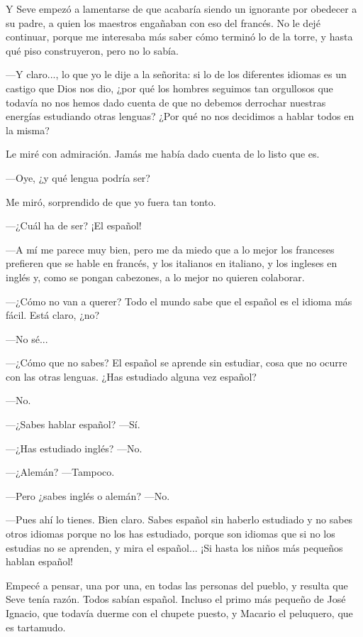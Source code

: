 \documentclass{barcodevapor3pags}
\begin{document}
Y Seve empezó a lamentarse de que acabaría siendo un ignorante por
obedecer a su padre, a quien los maestros engañaban con eso del francés.
No le dejé continuar, porque me interesaba más saber cómo terminó lo de
la torre, y hasta qué piso construyeron, pero no lo sabía.~

---Y claro..., lo que yo le dije a la señorita: si lo de los diferentes
idiomas es un castigo que Dios nos dio, ¿por qué los hombres seguimos
tan orgullosos que todavía no nos hemos dado cuenta de que no debemos
derrochar nuestras energías estudiando otras lenguas? ¿Por qué no nos
decidimos a hablar todos en la misma?~

Le miré con admiración. Jamás me había dado cuenta de lo listo que es.~

---Oye, ¿y qué lengua podría ser?~

Me miró, sorprendido de que yo fuera tan tonto.~

---¿Cuál ha de ser? ¡El español!~

---A mí me parece muy bien, pero me da miedo que a lo mejor los
franceses prefieren que se hable en francés, y los italianos en
italiano, y los ingleses en inglés y, como se pongan cabezones, a lo
mejor no quieren colaborar.~

---¿Cómo no van a querer? Todo el mundo sabe que el español es el idioma
más fácil. Está claro, ¿no?~

---No sé...~

---¿Cómo que no sabes? El español se aprende sin estudiar, cosa que no
ocurre con las otras lenguas. ¿Has estudiado alguna vez español?~

---No.~

---¿Sabes hablar español? ---Sí.~

---¿Has estudiado inglés? ---No.~

---¿Alemán? ---Tampoco.~

---Pero ¿sabes inglés o alemán? ---No.~

---Pues ahí lo tienes. Bien claro. Sabes español sin haberlo estudiado y
no sabes otros idiomas porque no los has estudiado, porque son idiomas
que si no los estudias no se aprenden, y mira el español... ¡Si hasta
los niños más pequeños hablan español!~

Empecé a pensar, una por una, en todas las personas del pueblo, y
resulta que Seve tenía razón. Todos sabían español. Incluso el primo más
pequeño de José Ignacio, que todavía duerme con el chupete puesto, y
Macario el peluquero, que es tartamudo.~
\end{document}

